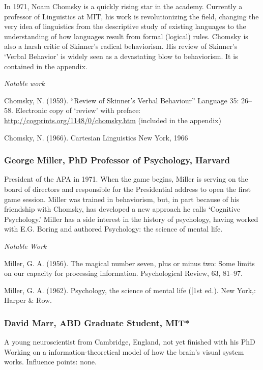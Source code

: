 \begin{refsection}
In 1971, Noam Chomsky is a quickly rising star in the academy. Currently a professor of Linguistics at MIT, his work is revolutionizing the field, changing the very idea of linguistics from the descriptive study of existing languages to the understanding of how languages result from formal (logical) rules. Chomsky is also a harsh critic of Skinner's radical behaviorism. His review of Skinner's `Verbal Behavior' is widely seen as a devastating blow to behaviorism. It is contained in the appendix.

\emph{Notable work}

Chomsky, N. (1959). ``Review of Skinner's Verbal Behaviour'' Language 35: 26--58. Electronic copy of ‘review’ with preface: \url{http://cogprints.org/1148/0/chomsky.htm} (included in the appendix)

Chomsky, N. (1966). Cartesian Linguistics New York, 1966

\subsubsection{George Miller, PhD Professor of Psychology, Harvard}
\label{georgemillerphdprofessorofpsychologyharvard}

President of the APA in 1971. When the game begins, Miller is serving on the board of directors and responsible for the Presidential address to open the first game session. Miller was trained in behaviorism, but, in part because of his friendship with Chomsky, has developed a new approach he calls `Cognitive Psychology.' Miller has a side interest in the history of psychology, having worked with E.G. Boring and authored Psychology: the science of mental life.

\emph{Notable Work}

Miller, G. A. (1956). The magical number seven, plus or minus two: Some limits on our capacity for processing information. Psychological Review, 63, 81--97.

Miller, G. A. (1962). Psychology, the science of mental life ([1st ed.). New York,: Harper \& Row.

\subsubsection{David Marr, ABD Graduate Student, MIT*}
\label{davidmarrabdgraduatestudentmit}

A young neuroscientist from Cambridge, England, not yet finished with his PhD Working on a information-theoretical model of how the brain's visual system works.
Influence points: none.


\end{refsection}

